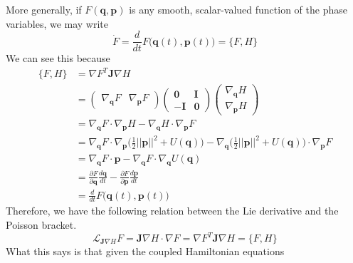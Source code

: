 \documentclass{article}
\begin{document}
      More generally, if $F(\mathbf{q}, \mathbf{p})$ is any smooth, scalar-valued function of the phase variables, we may write 
      \begin{equation}
        \dot{F} = \frac{d}{dt} F \big( \mathbf{q}(t), \mathbf{p}(t)\big) = \{F, H\}
      \end{equation}
      We can see this because 
      \begin{align*}
        \{F, H\} & = \nabla F^T \mathbf{J} \nabla H \\
        & = \begin{pmatrix}
        \nabla_\mathbf{q} F & \nabla_\mathbf{p} F 
        \end{pmatrix} \begin{pmatrix}
         \mathbf{0} & \mathbf{I} \\ -\mathbf{I} & \mathbf{0} 
        \end{pmatrix} \begin{pmatrix}
        \nabla_\mathbf{q} H \\ \nabla_\mathbf{p} H
        \end{pmatrix} \\
        & = \nabla_\mathbf{q} F \cdot \nabla_\mathbf{p} H - \nabla_\mathbf{q} H \cdot \nabla_\mathbf{p} F \\
        & = \nabla_\mathbf{q} F \cdot \nabla_\mathbf{p} \bigg( \frac{1}{2} ||\mathbf{p}||^2 + U(\mathbf{q}) \bigg) - \nabla_\mathbf{q} \bigg( \frac{1}{2} ||\mathbf{p}||^2 + U(\mathbf{q}) \bigg)  \cdot \nabla_\mathbf{p} F \\
        & = \nabla_\mathbf{q} F \cdot \mathbf{p} - \nabla_\mathbf{q} F \cdot \nabla_\mathbf{q} U(\mathbf{q}) \\
        & = \frac{\partial F}{\partial \mathbf{q}} \frac{ d \mathbf{q}}{d t} - \frac{\partial F}{\partial \mathbf{p}} \frac{d \mathbf{p}}{d t} \\
        & = \frac{d}{d t} F \big( \mathbf{q}(t), \mathbf{p}(t) \big) 
      \end{align*}
      Therefore, we have the following relation between the Lie derivative and the Poisson bracket. 
      \begin{equation}
        \mathcal{L}_{\mathbf{J} \nabla H} F = \mathbf{J} \nabla H \cdot \nabla F = \nabla F^T \mathbf{J} \nabla H = \{F, H\}
      \end{equation}
      What this says is that given the coupled Hamiltonian equations
\end{document}
